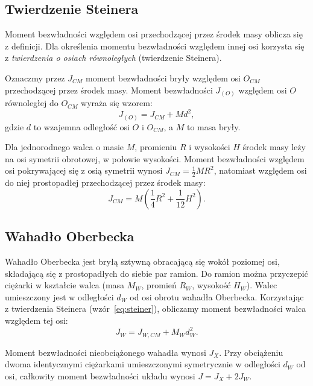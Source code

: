 \documentclass[12pt, a4paper]{article}
\begin{document}
\subsection{Twierdzenie Steinera}
Moment bezwładności względem osi przechodzącej przez środek masy oblicza się z definicji. Dla określenia momentu bezwładności względem innej osi korzysta się z \textit{twierdzenia o osiach równoległych} (twierdzenie Steinera).

Oznaczmy przez $J_{CM}$ moment bezwładności bryły względem osi $O_{CM}$ przechodzącej przez środek masy. Moment bezwładności $J_{(O)}$ względem osi $O$ równoległej do $O_{CM}$ wyraża się wzorem:
\begin{equation}
    J_{(O)} = J_{CM} + Md^2,
    \label{eq:steiner}
\end{equation}
gdzie $d$ to wzajemna odległość osi $O$ i $O_{CM}$, a $M$ to masa bryły.

Dla jednorodnego walca o masie $M$, promieniu $R$ i wysokości $H$ środek masy leży na osi symetrii obrotowej, w połowie wysokości. Moment bezwładności względem osi pokrywającej się z osią symetrii wynosi $J_{CM} = \frac{1}{2}MR^2$, natomiast względem osi do niej prostopadłej przechodzącej przez środek masy:
\begin{equation}
    J_{CM} = M\!\left(\frac{1}{4}R^2 + \frac{1}{12}H^2\right).
    \label{eq:cylinder_perp}
\end{equation}

\subsection{Wahadło Oberbecka}

Wahadło Oberbecka jest bryłą sztywną obracającą się wokół poziomej osi, składającą się z prostopadłych do siebie par ramion. Do ramion można przyczepić ciężarki w kształcie walca (masa $M_W$, promień $R_W$, wysokość $H_W$).
Walec umieszczony jest w odległości $d_W$ od osi obrotu wahadła Oberbecka. Korzystając z twierdzenia Steinera (wzór~\ref{eq:steiner}), obliczamy moment bezwładności walca względem tej osi:
\begin{equation}
    J_W = J_{W,CM} + M_W d_W^2.
\end{equation}

Moment bezwładności nieobciążonego wahadła wynosi $J_X$. Przy obciążeniu dwoma identycznymi ciężarkami umieszczonymi symetrycznie w odległości $d_W$ od osi, całkowity moment bezwładności układu wynosi $J = J_X + 2J_W$.
\end{document}
